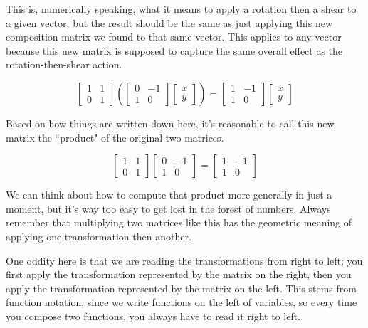 This is, numerically speaking, what it means to apply a rotation then a shear to
a given vector, but the result should be the same as just applying this new
composition matrix we found to that same vector. This applies to any vector
because this new matrix is supposed to capture the same overall effect as the
rotation-then-shear action.

\begin{equation*}
  \begin{bmatrix}
    1 & 1 \\
    0 & 1
  \end{bmatrix}\left(
  \begin{bmatrix}
    0 & -1 \\
    1 & 0
  \end{bmatrix}
  \begin{bmatrix}
    x \\
    y
  \end{bmatrix}\right) =
  \begin{bmatrix}
    1 & -1 \\
    1 & 0
  \end{bmatrix} \begin{bmatrix}
    x \\
    y
  \end{bmatrix}
\end{equation*}

Based on how things are written down here, it's reasonable to call this new
matrix the ``product" of the original two matrices.

\begin{equation*}
  \begin{bmatrix}
    1 & 1 \\
    0 & 1
  \end{bmatrix}
  \begin{bmatrix}
    0 & -1 \\
    1 & 0
  \end{bmatrix} =
  \begin{bmatrix}
    1 & -1 \\
    1 & 0
  \end{bmatrix}
\end{equation*}

We can think about how to compute that product more generally in just a moment,
but it's way too easy to get lost in the forest of numbers. Always remember
that multiplying two matrices like this has the geometric meaning of applying
one transformation then another.

One oddity here is that we are reading the transformations from right to left;
you first apply the transformation represented by the matrix on the right, then
you apply the transformation represented by the matrix on the left. This stems
from function notation, since we write functions on the left of variables, so
every time you compose two functions, you always have to read it right to left.

